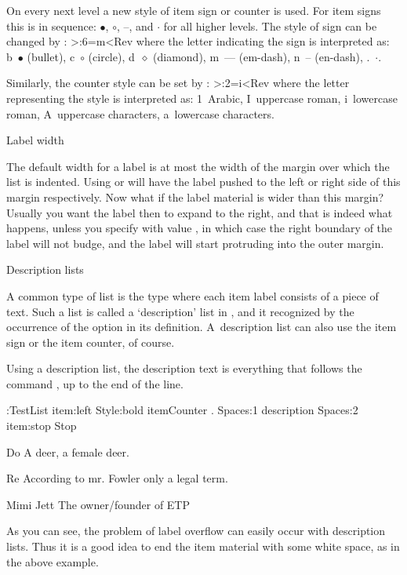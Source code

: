 On every next level a new style of item sign or counter is used. For
item signs this is in sequence: $\bullet$, $\circ$, --, and $\cdot$
for all higher levels. The style of sign can be changed by
: \Ver>\SetItemSign:6=m<Rev where the letter
indicating the sign is interpreted as: \n b~$\bullet$ (bullet), \n
c~$\circ$ (circle), \n d~$\diamond$ (diamond), \n m~--- (em-dash), \n
n~-- (en-dash), \n .~$\cdot$.

Similarly, the counter style can be set by
:
\Ver>\SetItemCounterRepresentation:2=i<Rev where the letter
representing the style is interpreted as: 1~Arabic, I~uppercase roman,
i~lowercase roman, A~uppercase characters, a~lowercase characters.

\Section Label width

The default width for a label is at most the width of the margin over
which the list is indented. Using  or 
will have the label pushed to the left or right side of this margin
respectively. Now what if the label material is wider than this
margin? Usually you want the label then to expand to the right, and
that is indeed what happens, unless you specify
 with value , in which case the right
boundary of the label will not budge, and the label will start
protruding into the outer margin.

 Description lists

A common type of list is the type where each item label consists of a
piece of text. Such a list is called a `description' list in
\Lollipop, and it recognized by the occurrence of the option
 in its definition. A~description list can also use
the item sign or the item counter, of course.

Using a description list, the description text is everything that
follows the command , up to the end of the line.

\Example
\DefineList:TestList 
 item:left Style:bold itemCounter . Spaces:1 description
      Spaces:2 item:stop Stop
\TestList\item Do
A deer, a female deer.\item Re
According to mr. Fowler only a legal term.
\item Mimi Jett
The owner/founder of ETP\>
\ExampleStop

As you can see, the problem of label overflow can easily occur with
description lists. Thus it is a good idea to end the item material
with some white space, as in the above example.

